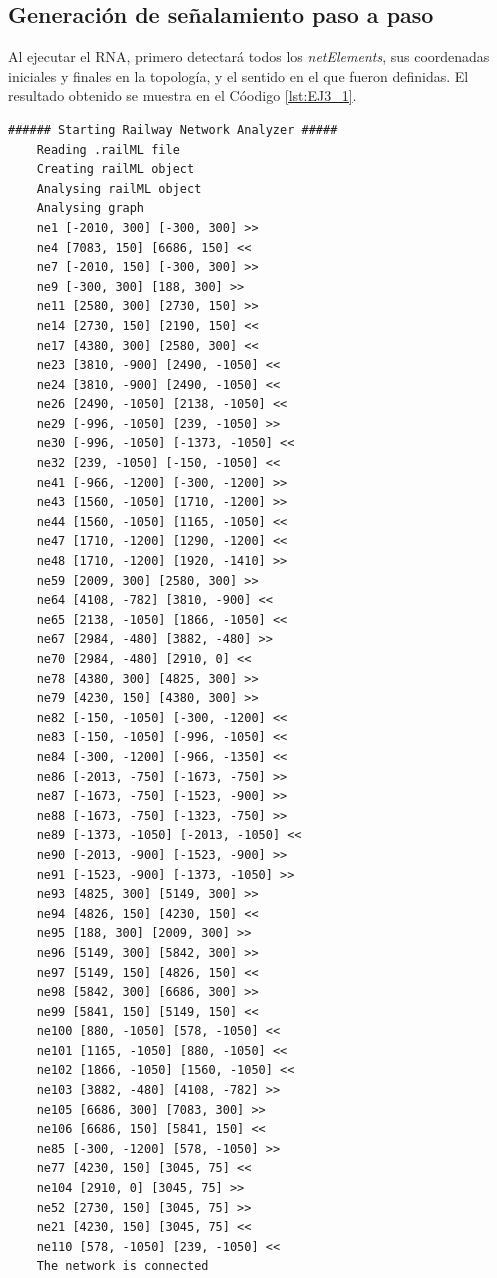 \subsection{Generación de señalamiento paso a paso}
	
	Al ejecutar el RNA, primero detectará todos los \textit{netElements}, sus coordenadas iniciales y finales en la topología, y el sentido en el que fueron definidas. El resultado obtenido se muestra en el Cóodigo \ref{lst:EJ3_1}.
	
	\begin{lstlisting}[language = {}, tabsize=4, basicstyle=\footnotesize\ttfamily, showspaces=false, showstringspaces=false, caption = Detección de \textit{netElements} por parte del RNA , label = {lst:EJ3_1}]
	###### Starting Railway Network Analyzer #####
	Reading .railML file
	Creating railML object
	Analysing railML object
	Analysing graph
	ne1 [-2010, 300] [-300, 300] >>   
	ne4 [7083, 150] [6686, 150] <<    
	ne7 [-2010, 150] [-300, 300] >>   
	ne9 [-300, 300] [188, 300] >>     
	ne11 [2580, 300] [2730, 150] >>   
	ne14 [2730, 150] [2190, 150] <<   
	ne17 [4380, 300] [2580, 300] <<   
	ne23 [3810, -900] [2490, -1050] <<
	ne24 [3810, -900] [2490, -1050] <<
	ne26 [2490, -1050] [2138, -1050] <<
	ne29 [-996, -1050] [239, -1050] >>
	ne30 [-996, -1050] [-1373, -1050] <<
	ne32 [239, -1050] [-150, -1050] <<
	ne41 [-966, -1200] [-300, -1200] >>
	ne43 [1560, -1050] [1710, -1200] >>
	ne44 [1560, -1050] [1165, -1050] <<
	ne47 [1710, -1200] [1290, -1200] <<
	ne48 [1710, -1200] [1920, -1410] >>
	ne59 [2009, 300] [2580, 300] >>
	ne64 [4108, -782] [3810, -900] <<
	ne65 [2138, -1050] [1866, -1050] <<
	ne67 [2984, -480] [3882, -480] >>
	ne70 [2984, -480] [2910, 0] <<
	ne78 [4380, 300] [4825, 300] >>
	ne79 [4230, 150] [4380, 300] >>
	ne82 [-150, -1050] [-300, -1200] <<
	ne83 [-150, -1050] [-996, -1050] <<
	ne84 [-300, -1200] [-966, -1350] <<
	ne86 [-2013, -750] [-1673, -750] >>
	ne87 [-1673, -750] [-1523, -900] >>
	ne88 [-1673, -750] [-1323, -750] >>
	ne89 [-1373, -1050] [-2013, -1050] <<
	ne90 [-2013, -900] [-1523, -900] >>
	ne91 [-1523, -900] [-1373, -1050] >>
	ne93 [4825, 300] [5149, 300] >>
	ne94 [4826, 150] [4230, 150] <<
	ne95 [188, 300] [2009, 300] >>
	ne96 [5149, 300] [5842, 300] >>
	ne97 [5149, 150] [4826, 150] <<
	ne98 [5842, 300] [6686, 300] >>
	ne99 [5841, 150] [5149, 150] <<
	ne100 [880, -1050] [578, -1050] <<
	ne101 [1165, -1050] [880, -1050] <<
	ne102 [1866, -1050] [1560, -1050] <<
	ne103 [3882, -480] [4108, -782] >>
	ne105 [6686, 300] [7083, 300] >>
	ne106 [6686, 150] [5841, 150] <<
	ne85 [-300, -1200] [578, -1050] >>
	ne77 [4230, 150] [3045, 75] <<
	ne104 [2910, 0] [3045, 75] >>
	ne52 [2730, 150] [3045, 75] >>
	ne21 [4230, 150] [3045, 75] <<
	ne110 [578, -1050] [239, -1050] <<
	The network is connected
	\end{lstlisting}
	

